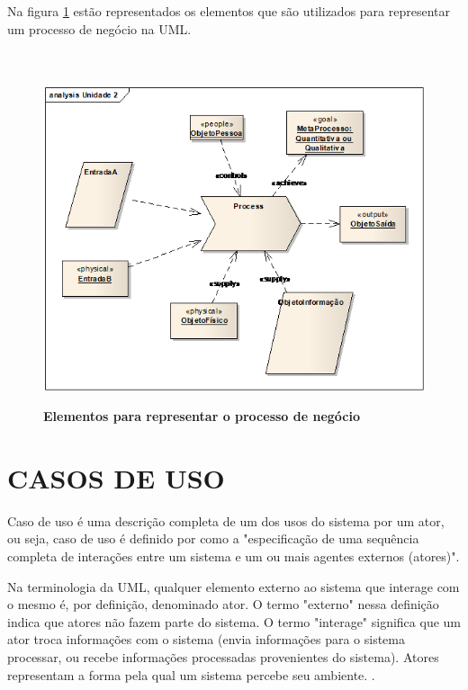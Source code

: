 \documentclass[
	12pt,				%
	openright,			%
	oneside,			%
	a4paper,			%
	chapter=TITLE,		%
	section=TITLE,		%
	english,			%
	french,				%
	spanish,			%
	brazil				%
	]{abntex2}
\begin{document}
Na figura \ref{fig-macroprocesso} estão representados os elementos que são utilizados para representar um processo de negócio na UML.
\\ \\ \\

\begin{figure}[htb]
	\begin{center}
		\caption{
			\textbf{Elementos para representar o processo de negócio}
		}\label{fig-macroprocesso}
		\includegraphics [scale=0.6]{imagens/macroprocesso.png}
		\label{fig-macroprocesso}
	\end{center}
\end{figure}



\section{CASOS DE USO}
Caso de uso é uma descrição completa de um dos usos do sistema por um ator, ou seja, caso de uso é definido por  como a "especificação de uma sequência completa de interações entre um sistema e um ou mais agentes externos (atores)".

\begin{citacao}
Na terminologia da UML, qualquer elemento externo ao sistema que interage com o mesmo é, por definição, denominado ator. O termo "externo" nessa definição indica que atores não fazem parte do sistema. O termo "interage" significa que um ator troca informações com o sistema (envia informações para o sistema processar, ou recebe informações processadas provenientes do sistema). Atores representam a forma pela qual um sistema percebe seu ambiente. \cite[p. 60]{bezerraUML}.
\end{citacao}
\end{document}
